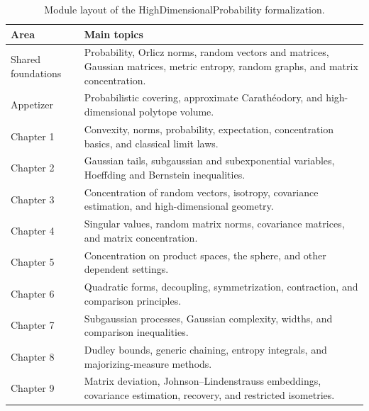 \begin{table}[htbp]
\centering
\small
\caption{Module layout of the HighDimensionalProbability formalization.}
\label{tab:hdp-module-layout}
\begin{tabularx}{\textwidth}{
  @{}>{\raggedright\arraybackslash}p{}
  >{\raggedright\arraybackslash}X@{}}
\toprule
Area & Main topics \\
\midrule
Shared foundations &
Probability, Orlicz norms, random vectors and matrices, Gaussian matrices, metric entropy, random graphs, and matrix concentration. \\

Appetizer &
Probabilistic covering, approximate Carathéodory, and high-dimensional polytope volume. \\

Chapter 1 &
Convexity, norms, probability, expectation, concentration basics, and classical limit laws. \\

Chapter 2 &
Gaussian tails, subgaussian and subexponential variables, Hoeffding and Bernstein inequalities. \\

Chapter 3 &
Concentration of random vectors, isotropy, covariance estimation, and high-dimensional geometry. \\

Chapter 4 &
Singular values, random matrix norms, covariance matrices, and matrix concentration. \\

Chapter 5 &
Concentration on product spaces, the sphere, and other dependent settings. \\

Chapter 6 &
Quadratic forms, decoupling, symmetrization, contraction, and comparison principles. \\

Chapter 7 &
Subgaussian processes, Gaussian complexity, widths, and comparison inequalities. \\

Chapter 8 &
Dudley bounds, generic chaining, entropy integrals, and majorizing-measure methods. \\

Chapter 9 &
Matrix deviation, Johnson--Lindenstrauss embeddings, covariance estimation, recovery, and restricted isometries. \\
\bottomrule
\end{tabularx}
\end{table}

